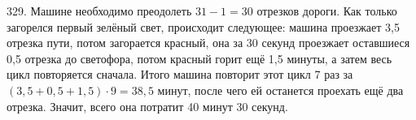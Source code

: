 329. Машине необходимо преодолеть $31-1=30$ отрезков  дороги. Как только загорелся первый зелёный свет, происходит следующее: машина проезжает 3,5 отрезка пути, потом загорается красный, она за 30 секунд проезжает оставшиеся 0,5 отрезка до светофора, потом красный горит ещё 1,5 минуты, а затем весь цикл повторяется сначала. Итого машина повторит этот цикл 7 раз за $(3,5+0,5+1,5)\cdot9=38,5$ минут, после чего ей останется проехать ещё два отрезка. Значит, всего она потратит 40 минут 30 секунд.\\
